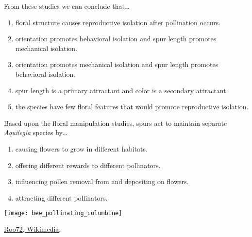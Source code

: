 \documentclass[t,hidelinks]{beamer}
\newcommand{\ques}[1]{\highlight{\textsc{q#1:}}}
\begin{document}
\begin{frame}[t]{\ques{14} From these studies we can conclude that\dots}
	
	\begin{enumerate}
		\item floral structure causes reproductive isolation after pollination occurs.
		
		\item \alert<2>{orientation promotes behavioral isolation and spur length promotes mechanical isolation.}

		\item orientation promotes mechanical isolation and spur length promotes behavioral isolation.
		
		\item spur length is a primary attractant and color is a secondary attractant.

		\item the species have few floral features that would promote reproductive isolation.
		
	\end{enumerate}

\end{frame}
%
\begin{frame}[t]{\ques{15} Based upon the floral manipulation studies, spurs act to maintain separate \textit{Aquilegia} species by\dots}
	
	{\raggedcolumns
	\begin{multicols}{2}
	\begin{enumerate}
		\item causing flowers to grow in different habitats.
		\item offering different rewards to different pollinators.
		\item \alert<2>{influencing pollen removal from and depositing on flowers.}
		\item attracting different pollinators.
	\end{enumerate}

	\columnbreak
	
		\texttt{[image: bee\_pollinating\_columbine]}
	\end{multicols}
	}
	
	\vfilll
	
	\hfill \tiny \href{https://commons.wikimedia.org/wiki/File:Bee_pollinating_Aquilegia_vulgaris.JPG}{Roo72, Wikimedia, }
\end{frame}
%
\end{document}
